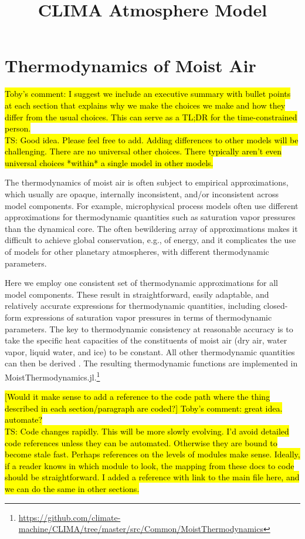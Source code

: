 \documentclass{report}
\title{CLIMA Atmosphere Model}
\author{ }
\begin{document}
\maketitle
\tableofcontents

\chapter{Thermodynamics of Moist Air}\label{s:thermodynamics}

\hl{Toby's comment: I suggest we include an executive summary with bullet points at each section that explains why we make the choices we make and how they differ from the usual choices. This can serve as a TL;DR for the time-constrained person.\\
TS: Good idea. Please feel free to add. Adding differences to other models will be challenging. There are no universal other choices. There typically aren't even universal choices *within* a single model in other models.}

The thermodynamics of moist air is often subject to empirical approximations, which usually are opaque, internally inconsistent, and/or inconsistent across model components. For example, microphysical process models often use different approximations for thermodynamic quantities such as saturation vapor pressures than the dynamical core. The often bewildering array of approximations makes it difficult to achieve global conservation, e.g., of energy, and it complicates the use of models for other planetary atmospheres, with different thermodynamic parameters. 

Here we employ one consistent set of thermodynamic approximations for all model components. These result in straightforward, easily adaptable, and relatively accurate expressions for thermodynamic quantities, including closed-form expressions of saturation vapor pressures in terms of thermodynamic parameters. The key to thermodynamic consistency at reasonable accuracy is to take the specific heat capacities of the constituents of moist air (dry air, water vapor, liquid water, and ice) to be constant. All other thermodynamic quantities can then be derived \citep[cf.][]{Romps08a,Marquet16a}. The resulting thermodynamic functions are implemented in MoistThermodynamics.jl.\footnote{\url{https://github.com/climate-machine/CLIMA/tree/master/src/Common/MoistThermodynamics}}

\hl{[Would it make sense to add a reference to the code path where the thing  described in each section/paragraph are coded?] Toby's comment: great idea. automate?\\
TS: Code changes rapidly. This will be more slowly evolving. I'd avoid detailed code references unless they can be automated. Otherwise they are bound to become stale fast. Perhaps references on the levels of modules make sense. Ideally, if a reader knows in which module to look, the mapping from these docs to code should be straightforward. I added a reference with link to the main file here, and we can do the same in other sections.}
\end{document}
